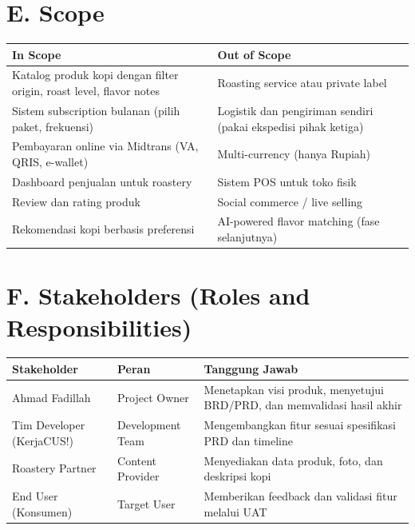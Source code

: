 \documentclass[11pt,a4paper]{article}
\begin{document}
\section{E. Scope}
\noindent\small
\begin{tabularx}{\textwidth}{|X|X|}
\hline
\centering\textbf{In Scope}\arraybackslash & \centering\textbf{Out of Scope}\arraybackslash \\\hline
Katalog produk kopi dengan filter origin, roast level, flavor notes & Roasting service atau private label \\\hline
Sistem subscription bulanan (pilih paket, frekuensi) & Logistik dan pengiriman sendiri (pakai ekspedisi pihak ketiga) \\\hline
Pembayaran online via Midtrans (VA, QRIS, e-wallet) & Multi-currency (hanya Rupiah) \\\hline
Dashboard penjualan untuk roastery & Sistem POS untuk toko fisik \\\hline
Review dan rating produk & Social commerce / live selling \\\hline
Rekomendasi kopi berbasis preferensi & AI-powered flavor matching (fase selanjutnya) \\\hline
\end{tabularx}\normalsize

\section{F. Stakeholders (Roles and Responsibilities)}
\noindent\small
\begin{tabularx}{\textwidth}{|p{3.2cm}|p{2.8cm}|X|}
\hline
\centering\textbf{Stakeholder}\arraybackslash & \centering\textbf{Peran}\arraybackslash & \centering\textbf{Tanggung Jawab}\arraybackslash \\\hline
Ahmad Fadillah & Project Owner & Menetapkan visi produk, menyetujui BRD/PRD, dan memvalidasi hasil akhir \\\hline
Tim Developer (KerjaCUS!) & Development Team & Mengembangkan fitur sesuai spesifikasi PRD dan timeline \\\hline
Roastery Partner & Content Provider & Menyediakan data produk, foto, dan deskripsi kopi \\\hline
End User (Konsumen) & Target User & Memberikan feedback dan validasi fitur melalui UAT \\\hline
\end{tabularx}\normalsize
\end{document}
